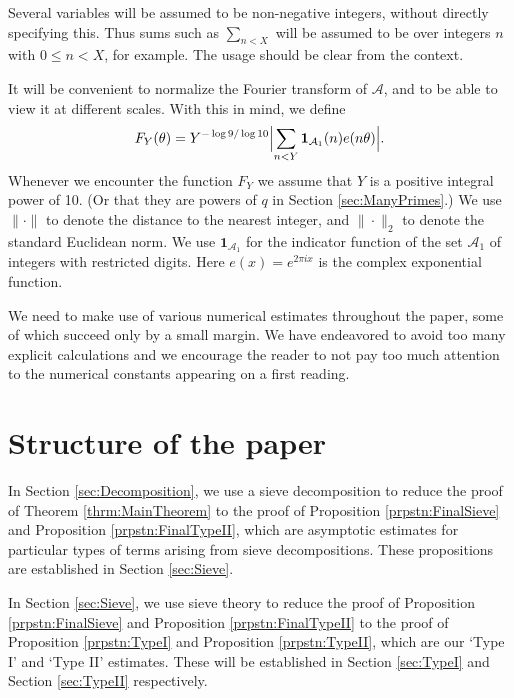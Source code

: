 \documentclass[10pt]{amsart}
\theoremstyle{plain}
\numberwithin{sblmm}{thrm}
\numberwithin{equation}{section}
\begin{document}
Several variables will be assumed to be non-negative integers, without directly specifying this. Thus sums such as $\sum_{n<X}$ will be assumed to be over integers $n$ with $0\le n<X$, for example. The usage should be clear from the context.

It will be convenient to normalize the Fourier transform of $\mathcal{A}$, and to be able to view it at different scales. With this in mind, we define
%
\begin{equation}
F_{Y}(\theta)=Y^{-\log{9}/\log{10}}\Bigl|\sum_{n<Y}\mathbf{1}_{\mathcal{A}_1}(n)e(n\theta)\Bigr|.\label{eq:FyDef}
\end{equation}
%
 Whenever we encounter the function $F_Y$ we assume that $Y$ is a positive integral power of 10. (Or that they are powers of $q$ in Section \ref{sec:ManyPrimes}.) We use $\|\cdot\|$ to denote the distance to the nearest integer, and $\|\cdot\|_2$ to denote the standard Euclidean norm. We use $\mathbf{1}_{\mathcal{A}_1}$ for the indicator function of the set $\mathcal{A}_1$ of integers with restricted digits. Here $e(x)=e^{2\pi i x}$ is the complex exponential function.

We need to make use of various numerical estimates throughout the paper, some of which succeed only by a small margin. We have endeavored to avoid too many explicit calculations and we encourage the reader to not pay too much attention to the numerical constants appearing on a first reading.
%
%
%
%
%
%
\section{Structure of the paper}
%
%
%
In Section \ref{sec:Decomposition}, we use a sieve decomposition to reduce the proof of Theorem \ref{thrm:MainTheorem} to the proof of Proposition \ref{prpstn:FinalSieve} and Proposition \ref{prpstn:FinalTypeII}, which are asymptotic estimates for particular types of terms arising from sieve decompositions. These propositions are established in Section \ref{sec:Sieve}.

In Section \ref{sec:Sieve}, we use sieve theory to reduce the proof of Proposition \ref{prpstn:FinalSieve} and Proposition \ref{prpstn:FinalTypeII} to the proof of Proposition \ref{prpstn:TypeI} and Proposition \ref{prpstn:TypeII}, which are our `Type I' and `Type II' estimates. These will be established in Section \ref{sec:TypeI} and Section \ref{sec:TypeII} respectively.
\end{document}
